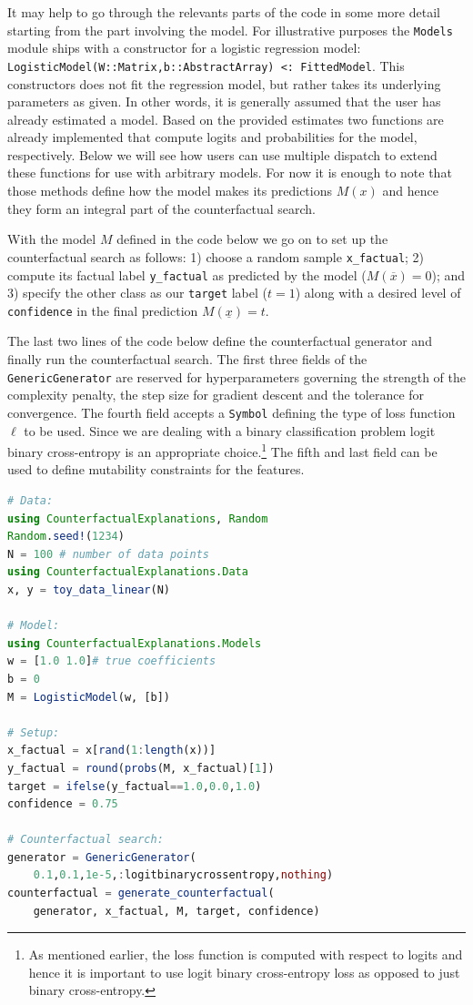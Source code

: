 \documentclass[
  letterpaper,
  DIV=11,
  numbers=noendperiod]{scrartcl}
\begin{document}
It may help to go through the relevants parts of the code in some more
detail starting from the part involving the model. For illustrative
purposes the \texttt{Models} module ships with a constructor for a
logistic regression model:
\texttt{LogisticModel(W::Matrix,b::AbstractArray)\ \textless{}:\ FittedModel}.
This constructors does not fit the regression model, but rather takes
its underlying parameters as given. In other words, it is generally
assumed that the user has already estimated a model. Based on the
provided estimates two functions are already implemented that compute
logits and probabilities for the model, respectively. Below we will see
how users can use multiple dispatch to extend these functions for use
with arbitrary models. For now it is enough to note that those methods
define how the model makes its predictions \(M(x)\) and hence they form
an integral part of the counterfactual search.

With the model \(M\) defined in the code below we go on to set up the
counterfactual search as follows: 1) choose a random sample
\texttt{x\_factual}; 2) compute its factual label \texttt{y\_factual} as
predicted by the model (\(M(\overline{x})=0\)); and 3) specify the other
class as our \texttt{target} label (\(t=1\)) along with a desired level
of \texttt{confidence} in the final prediction \(M(\underline{x})=t\).

The last two lines of the code below define the counterfactual generator
and finally run the counterfactual search. The first three fields of the
\texttt{GenericGenerator} are reserved for hyperparameters governing the
strength of the complexity penalty, the step size for gradient descent
and the tolerance for convergence. The fourth field accepts a
\texttt{Symbol} defining the type of loss function \(\ell\) to be used.
Since we are dealing with a binary classification problem logit binary
cross-entropy is an appropriate choice.\footnote{As mentioned earlier,
  the loss function is computed with respect to logits and hence it is
  important to use logit binary cross-entropy loss as opposed to just
  binary cross-entropy.} The fifth and last field can be used to define
mutability constraints for the features.

\begin{lstlisting}[language = Julia]
# Data:
using CounterfactualExplanations, Random
Random.seed!(1234)
N = 100 # number of data points
using CounterfactualExplanations.Data
x, y = toy_data_linear(N) 

# Model:
using CounterfactualExplanations.Models 
w = [1.0 1.0]# true coefficients
b = 0
M = LogisticModel(w, [b])

# Setup:
x_factual = x[rand(1:length(x))]
y_factual = round(probs(M, x_factual)[1])
target = ifelse(y_factual==1.0,0.0,1.0) 
confidence = 0.75 

# Counterfactual search:
generator = GenericGenerator(
    0.1,0.1,1e-5,:logitbinarycrossentropy,nothing)
counterfactual = generate_counterfactual(
    generator, x_factual, M, target, confidence)
\end{lstlisting}
\end{document}
